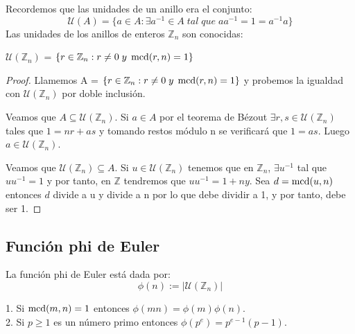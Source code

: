 Recordemos que las unidades de un anillo era el conjunto: $$\mathcal U(A) = \{a \in A : \exists a^{-1} \in A \; tal \; que \; aa^{-1}=1=a^{-1}a\}$$ Las unidades de los anillos de enteros $\mathbb{Z}_n$ son conocidas:

\begin{nprop}
$\mathcal U(\mathbb{Z}_n)$ = $\{r \in \mathbb{Z}_n : r \neq 0 \; y \; \operatorname*{mcd}(r,n) = 1 \}$
\end{nprop}

\begin{proof}

Llamemos A = $\{r \in \mathbb{Z}_n : r \neq 0 \; y \; \operatorname*{mcd}(r,n) = 1 \}$ y probemos la igualdad con $\mathcal U(\mathbb{Z}_n)$ por doble inclusión.

Veamos que $A \subseteq \mathcal U(\mathbb{Z}_n)$. Si $a \in A$ por el teorema de Bézout $\exists r,s \in \mathcal U(\mathbb{Z}_n)$ tales que $1 = nr+as$ y tomando restos módulo n se verificará que $1 = as$. Luego $a \in \mathcal U(\mathbb{Z}_n)$.

Veamos que $\mathcal U(\mathbb{Z}_n) \subseteq A$. Si $u \in \mathcal U(\mathbb{Z}_n)$ tenemos que en $\mathbb{Z}_n$, $\exists u^{-1}$ tal que $uu^{-1} = 1$ y por tanto, en $\mathbb{Z}$ tendremos que $uu^{-1} = 1 + ny$. Sea $d = \operatorname*{mcd}(u,n)$ entonces $d$ divide a u y divide a n por lo que debe dividir a 1, y por tanto, debe ser 1.

\end{proof}

\subsection{Función phi de Euler}

\begin{ndef}
La función phi de Euler está dada por: $$\phi(n) := |\mathcal U(\mathbb{Z}_n)|$$
\end{ndef}

\begin{nprop}
1. Si $\operatorname*{mcd}(m,n) = 1$ entonces $\phi(mn) = \phi(m) \phi(n)$. \\
2. Si $p \ge 1$ es un número primo entonces $\phi(p^{e}) = p^{e-1}(p-1)$.
\end{nprop}

